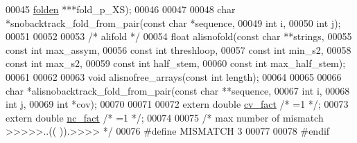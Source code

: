 \begin{DoxyCode}
00045                              \hyperlink{group__data__structures_structnode}{folden} ***fold\_p\_XS);
00046 
00047 
00048 \textcolor{keywordtype}{char} *snobacktrack\_fold\_from\_pair(\textcolor{keyword}{const} \textcolor{keywordtype}{char}  *sequence,
00049                                   \textcolor{keywordtype}{int}         i,
00050                                   \textcolor{keywordtype}{int}         j);
00051 
00052 
00053 \textcolor{comment}{/* alifold */}
00054 \textcolor{keywordtype}{float} alisnofold(\textcolor{keyword}{const} \textcolor{keywordtype}{char} **strings,
00055                  \textcolor{keyword}{const} \textcolor{keywordtype}{int}  max\_assym,
00056                  \textcolor{keyword}{const} \textcolor{keywordtype}{int}  threshloop,
00057                  \textcolor{keyword}{const} \textcolor{keywordtype}{int}  min\_s2,
00058                  \textcolor{keyword}{const} \textcolor{keywordtype}{int}  max\_s2,
00059                  \textcolor{keyword}{const} \textcolor{keywordtype}{int}  half\_stem,
00060                  \textcolor{keyword}{const} \textcolor{keywordtype}{int}  max\_half\_stem);
00061 
00062 
00063 \textcolor{keywordtype}{void}  alisnofree\_arrays(\textcolor{keyword}{const} \textcolor{keywordtype}{int} length);
00064 
00065 
00066 \textcolor{keywordtype}{char} *alisnobacktrack\_fold\_from\_pair(\textcolor{keyword}{const} \textcolor{keywordtype}{char} **sequence,
00067                                      \textcolor{keywordtype}{int}        i,
00068                                      \textcolor{keywordtype}{int}        j,
00069                                      \textcolor{keywordtype}{int}        *cov);
00070 
00071 
00072 \textcolor{keyword}{extern} \textcolor{keywordtype}{double} \hyperlink{group__consensus__fold_gaf3cbac6ff5d706d6e414677841ddf94c}{cv\_fact} \textcolor{comment}{/* =1 */};
00073 \textcolor{keyword}{extern} \textcolor{keywordtype}{double} \hyperlink{group__consensus__fold_ga502948a122a2af5b914355b1f3ea2f61}{nc\_fact} \textcolor{comment}{/* =1 */};
00074 
00075 \textcolor{comment}{/* max number of mismatch >>>>>..((   )).>>>> */}
00076 \textcolor{preprocessor}{#define MISMATCH 3}
00077 
00078 \textcolor{preprocessor}{#endif}
\end{DoxyCode}
